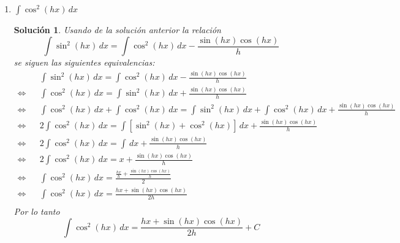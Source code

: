 \documentclass[a4paper,11pt]{article}
\theoremstyle{teoremas}
\theoremstyle{ejemplos}
\theoremstyle{definiciones}
\theoremstyle{lemas}
\newtheorem*{solucion}{Soluci\'on}
\begin{document}
\begin{enumerate}
 \item $\int \cos^2(hx) \, dx$
 \begin{solucion}
  Usando de la soluci\'on anterior la relaci\'on
  \begin{equation*}
   \int \sin^2(hx) \, dx = \int \cos^2(hx) \, dx - \frac{\sin(hx)\cos(hx)}{h}
  \end{equation*}
  se siguen las siguientes equivalencias:
  \begin{eqnarray*}
   & & \int \sin^2(hx) \, dx = \int \cos^2(hx) \, dx - \frac{\sin(hx)\cos(hx)}{h} \\ 
   \Leftrightarrow & & \int \cos^2(hx) \, dx = \int \sin^2(hx) \, dx + \frac{\sin(hx)\cos(hx)}{h} \\ 
   \Leftrightarrow & & \int \cos^2(hx) \, dx + \int \cos^2(hx) \, dx = \int \sin^2(hx) \, dx + \int \cos^2(hx) \, dx + \frac{\sin(hx)\cos(hx)}{h} \\ 
   \Leftrightarrow & & 2 \int \cos^2(hx) \, dx = \int \left[ \sin^2(hx) + \cos^2(hx) \right] \, dx + \frac{\sin(hx)\cos(hx)}{h} \\ 
   \Leftrightarrow & & 2 \int \cos^2(hx) \, dx = \int \, dx + \frac{\sin(hx)\cos(hx)}{h} \\ 
   \Leftrightarrow & & 2 \int \cos^2(hx) \, dx = x + \frac{\sin(hx)\cos(hx)}{h} \\ 
   \Leftrightarrow & & \int \cos^2(hx) \, dx = \frac{ \displaystyle{ \frac{hx}{h} + \frac{\sin(hx)\cos(hx)}{h} }}{2} \\ 
   \Leftrightarrow & & \int \cos^2(hx) \, dx = \frac{ hx + \sin(hx)\cos(hx) }{2h} \\   
  \end{eqnarray*}
  Por lo tanto
  \begin{equation}
   \int \cos^2(hx) \, dx = \frac{ hx + \sin(hx)\cos(hx) }{2h} + C
  \end{equation}
 \end{solucion}



\end{enumerate}
\end{document}
